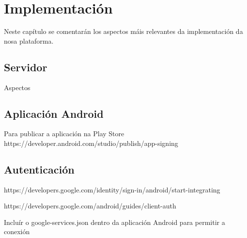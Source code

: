 \chapter{Implementación}

Neste capítulo se comentarán los aspectos máis relevantes da implementación da nosa plataforma.



\section{Servidor}


Aspectos


\section{Aplicación Android}

Para publicar a aplicación na Play Store
https://developer.android.com/studio/publish/app-signing


\section{Autenticación}

https://developers.google.com/identity/sign-in/android/start-integrating


https://developers.google.com/android/guides/client-auth


Incluír o google-services.json dentro da aplicación Android para permitir a conexión
